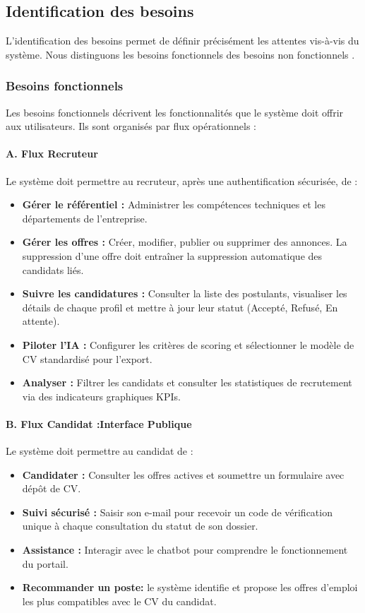 \documentclass[12pt,a4paper,oneside]{report}
\begin{document}
\begin{itemize}
\subsection{Identification des besoins}

L'identification des besoins permet de définir précisément les attentes vis-à-vis du système. Nous distinguons les besoins fonctionnels des besoins non fonctionnels .

\subsubsection{Besoins fonctionnels}

Les besoins fonctionnels décrivent les fonctionnalités que le système doit offrir aux utilisateurs. Ils sont organisés par flux opérationnels :

\paragraph{A. Flux Recruteur }
Le système doit permettre au recruteur, après une authentification sécurisée, de :
\begin{itemize}
    \item \textbf{Gérer le référentiel :} Administrer les compétences techniques et les départements de l'entreprise.
    \item \textbf{Gérer les offres :} Créer, modifier, publier ou supprimer des annonces. La suppression d'une offre doit entraîner la suppression automatique des candidats liés.
    \item \textbf{Suivre les candidatures :} Consulter la liste des postulants, visualiser les détails de chaque profil et mettre à jour leur statut (Accepté, Refusé, En attente).
    \item \textbf{Piloter l'IA :} Configurer les critères de scoring et sélectionner le modèle de CV standardisé pour l'export.
    \item \textbf{Analyser :} Filtrer les candidats et consulter les statistiques de recrutement via des indicateurs graphiques KPIs.
\end{itemize}

\paragraph{B. Flux Candidat :Interface Publique}
Le système doit permettre au candidat de :
\begin{itemize}
    \item \textbf{Candidater :} Consulter les offres actives et soumettre un formulaire avec dépôt de CV.
    \item \textbf{Suivi sécurisé :} Saisir son e-mail pour recevoir un code de vérification unique à chaque consultation du statut de son dossier.
    \item \textbf{Assistance :} Interagir avec le chatbot pour  comprendre le fonctionnement du portail.
    \item \textbf{Recommander un poste:}  le système identifie et propose les offres d'emploi les plus compatibles avec le CV du candidat.
\end{itemize}


\end{itemize}
\end{document}
